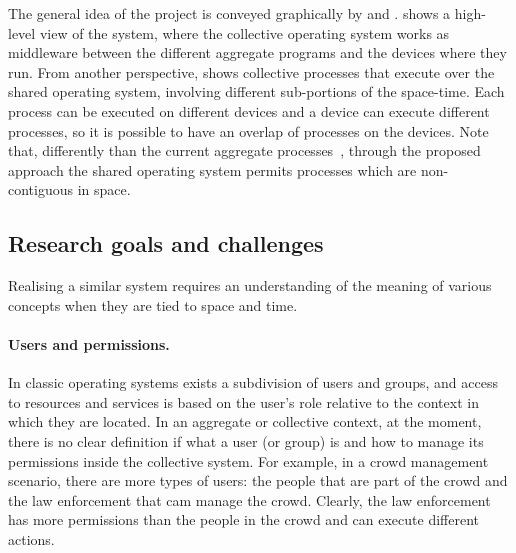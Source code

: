 \documentclass[12pt, a4paper]{article}
\begin{document}
The general idea of the project is conveyed graphically by
 and .
%
 shows a high-level view of the system,
where the collective operating system works as middleware between the different aggregate programs and the devices where they run.
%
From another perspective,
 shows collective processes that execute over the shared operating system,
involving different sub-portions of the space-time.
%
Each process can be executed on different devices and a device can execute different processes,
so it is possible to have an overlap of processes on the devices.
%
Note that, differently than the current aggregate processes~\cite{EAAI2020-processes},
through the proposed approach
the shared operating system permits processes which are non-contiguous in space.


\subsection{Research goals and challenges}
\label{subsec:research-goals-and-challenges}

Realising a similar system requires an understanding of the meaning of various concepts when they are tied to space and time.

\paragraph{Users and permissions.}
In classic operating systems exists a subdivision of users and groups,
and access to resources and services is based on the user's role relative to the context in which they are located.
%
In an aggregate or collective context,
at the moment,
there is no clear definition if what a user (or group) is and how to manage its permissions inside the collective system.
%
For example,
in a crowd management scenario,
there are more types of users: the people that are part of the crowd and the law enforcement that cam manage the crowd.
%
Clearly,
the law enforcement has more permissions than the people in the crowd and can execute different actions.
%
\end{document}
